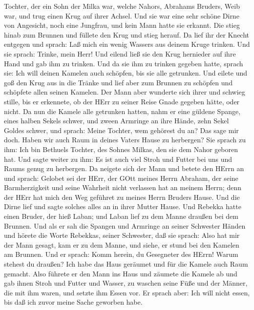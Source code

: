 Tochter, der ein Sohn der Milka war, welche Nahors, Abrahams Bruders,
Weib war, und trug einen Krug auf ihrer Achsel.  Und sie
war eine sehr schöne Dirne von Angesicht, noch eine Jungfrau, und kein
Mann hatte sie erkannt. Die stieg hinab zum Brunnen und füllete den Krug
und stieg herauf.  Da lief ihr der Knecht entgegen und
sprach: Laß mich ein wenig Wassers aus deinem Kruge trinken.
 Und sie sprach: Trinke, mein Herr! Und eilend ließ sie den
Krug hernieder auf ihre Hand und gab ihm zu trinken.  Und
da sie ihm zu trinken gegeben hatte, sprach sie: Ich will deinen Kamelen
auch schöpfen, bis sie alle getrunken.  Und eilete und goß
den Krug aus in die Tränke und lief aber zum Brunnen zu schöpfen und
schöpfete allen seinen Kamelen.  Der Mann aber wunderte
sich ihrer und schwieg stille, bis er erkennete, ob der HErr zu seiner
Reise Gnade gegeben hätte, oder nicht.  Da nun die Kamele
alle getrunken hatten, nahm er eine güldene Spange, eines halben Sekels
schwer, und zween Armringe an ihre Hände, zehn Sekel Goldes schwer,
 und sprach: Meine Tochter, wem gehörest du an? Das sage
mir doch. Haben wir auch Raum in deines Vaters Hause zu herbergen?
 Sie sprach zu ihm: Ich bin Bethuels Tochter, des Sohnes
Milkas, den sie dem Nahor geboren hat.  Und sagte weiter zu
ihm: Es ist auch viel Stroh und Futter bei uns und Raums genug zu
herbergen.  Da neigete sich der Mann und betete den HErrn
an  und sprach: Gelobet sei der HErr, der GOtt meines Herrn
Abraham, der seine Barmherzigkeit und seine Wahrheit nicht verlassen hat
an meinem Herrn; denn der HErr hat mich den Weg geführet zu meines Herrn
Bruders Hause.  Und die Dirne lief und sagte solches alles
an in ihrer Mutter Hause.  Und Rebekka hatte einen Bruder,
der hieß Laban; und Laban lief zu dem Manne draußen bei dem Brunnen.
 Und als er sah die Spangen und Armringe an seiner
Schwester Händen und hörete die Worte Rebekkas, seiner Schwester, daß
sie sprach: Also hat mir der Mann gesagt, kam er zu dem Manne, und
siehe, er stund bei den Kamelen am Brunnen.  Und er sprach:
Komm herein, du Gesegneter des HErrn! Warum stehest du draußen? Ich habe
das Haus geräumet und für die Kamele auch Raum gemacht. 
Also führete er den Mann ins Haus und zäumete die Kamele ab und gab
ihnen Stroh und Futter und Wasser, zu waschen seine Füße und der Männer,
die mit ihm waren,  und setzte ihm Essen vor. Er sprach
aber: Ich will nicht essen, bis daß ich zuvor meine Sache geworben habe.

